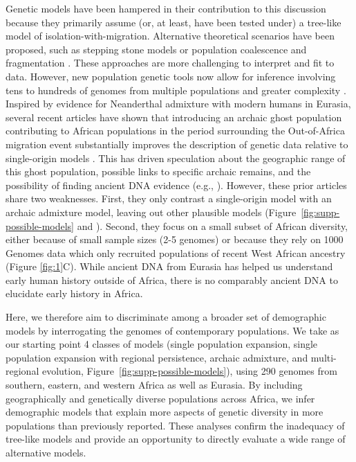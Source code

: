 \documentclass[]{article}
\begin{document}
Genetic models have been hampered in their contribution to this discussion
because they primarily assume (or, at least, have been tested under) a
tree-like model of isolation-with-migration. Alternative theoretical scenarios
have been proposed, such as stepping stone models \citep{Arredondo2021-qa} or
population coalescence and fragmentation \citep{Scerri2019-xg}. These
approaches are more challenging to interpret and fit to data. However, new
population genetic tools now allow for inference involving tens to
hundreds of genomes from multiple populations and greater complexity
\citep{Kamm2020-vn,Ragsdale2019-nt,Speidel2019-nj}. Inspired by evidence for
Neanderthal admixture with modern humans in Eurasia, several recent articles
have shown that introducing an archaic ghost population contributing to African
populations in the period surrounding the Out-of-Africa migration event
substantially improves the description of genetic data relative to
single-origin models
\citep{Plagnol2006-lt,Hammer2011-bx,Hsieh2016-gk,Hey2018-pw,Ragsdale2019-nt,Durvasula2020-td,Lorente-Galdos2019-vz,Durvasula2020-td}.
This has driven speculation about the geographic range of this ghost
population, possible links to specific archaic remains, and the possibility of
finding ancient DNA evidence (e.g., \citet{Hsieh2016-gk}). However, these prior
articles share two weaknesses. First, they only contrast a single-origin model
with an archaic admixture model, leaving out other plausible models
(Figure~\ref{fig:supp-possible-models} and \citet{Henn2018-rf}). Second, they
focus on a small subset of African diversity, either because of small sample
sizes (2-5 genomes) or because they rely on 1000 Genomes data which only
recruited populations of recent West African ancestry (Figure \ref{fig:1}C). While ancient DNA from
Eurasia has helped us understand early human history outside of Africa, there
is no comparably ancient DNA to elucidate early history in Africa.

Here, we therefore aim to discriminate among a broader set of demographic
models by interrogating the genomes of contemporary populations. We take as our
starting point 4 classes of models (single population expansion, single
population expansion with regional persistence, archaic admixture, and
multi-regional evolution, Figure~\ref{fig:supp-possible-models}), using 290
genomes from southern, eastern, and western Africa as well as Eurasia. By
including geographically and genetically diverse populations across Africa, we
infer demographic models that explain more aspects of genetic diversity in more
populations than previously reported. These analyses confirm the inadequacy of
tree-like models and provide an opportunity to directly evaluate a wide range
of alternative models. 
\end{document}
